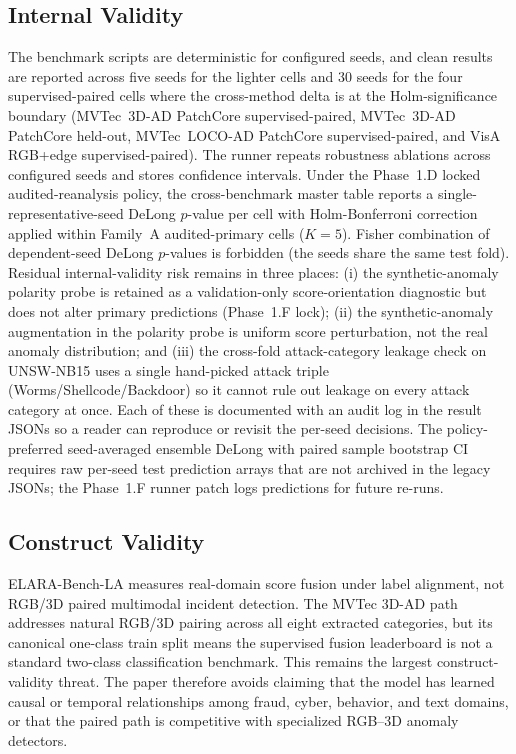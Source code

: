 \documentclass[10pt,conference]{IEEEtran}
\newcommand{\benchmark}{ELARA-Bench-LA}
\begin{document}
\subsection{Internal Validity}
The benchmark scripts are deterministic for configured seeds, and clean
results are reported across five seeds for the lighter cells and 30
seeds for the four supervised-paired cells where the cross-method delta
is at the Holm-significance boundary (MVTec~3D-AD PatchCore
supervised-paired, MVTec~3D-AD PatchCore held-out, MVTec~LOCO-AD
PatchCore supervised-paired, and VisA RGB+edge supervised-paired). The
runner repeats robustness ablations across configured seeds and stores
confidence intervals. Under the Phase~1.D locked
audited-reanalysis policy, the cross-benchmark master table reports
a single-representative-seed DeLong $p$-value per cell with
Holm-Bonferroni correction applied within Family~A audited-primary
cells ($K{=}5$). Fisher combination of dependent-seed DeLong
$p$-values is forbidden (the seeds share the same test fold).
Residual internal-validity risk remains in three places: (i) the
synthetic-anomaly polarity probe is retained as a
validation-only score-orientation diagnostic but does not alter
primary predictions (Phase~1.F lock); (ii) the
synthetic-anomaly augmentation in the polarity probe is uniform
score perturbation, not the real anomaly distribution; and
(iii) the cross-fold attack-category leakage check on UNSW-NB15
uses a single hand-picked attack triple
(Worms/Shellcode/Backdoor) so it cannot rule out leakage on every
attack category at once. Each of these is documented with an audit
log in the result JSONs so a reader can reproduce or revisit the
per-seed decisions. The policy-preferred seed-averaged ensemble
DeLong with paired sample bootstrap CI requires raw per-seed test
prediction arrays that are not archived in the legacy JSONs; the
Phase~1.F runner patch logs predictions for future re-runs.

\subsection{Construct Validity}
\benchmark{} measures real-domain score fusion under label alignment,
not RGB/3D paired multimodal incident detection. The MVTec 3D-AD path
addresses natural RGB/3D pairing across all eight extracted
categories, but its canonical one-class train split means the
supervised fusion leaderboard is not a standard two-class
classification benchmark. This remains the largest construct-validity
threat. The paper therefore avoids claiming that the model has learned
causal or temporal relationships among fraud, cyber, behavior, and
text domains, or that the paired path is competitive with specialized
RGB--3D anomaly detectors.
\end{document}
